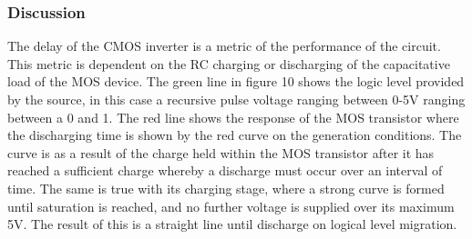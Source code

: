 \documentclass[12pt]{article}
\begin{document}
\subsubsection{Discussion}
The delay of the CMOS inverter is a metric of the performance of the circuit. This metric is dependent on the RC charging or discharging of the capacitative load of the MOS device. The green line in figure 10 shows the logic level provided by the source, in this case a recursive pulse voltage ranging between 0-5V ranging between a 0 and 1. The red line shows the response of the MOS transistor where the discharging time is shown by the red curve on the generation conditions. The curve is as a result of the charge held within the MOS transistor after it has reached a sufficient charge whereby a discharge must occur over an interval of time. The same is true with its charging stage, where a strong curve is formed until saturation is reached, and no further voltage is supplied over its maximum 5V. The result of this is a straight line until discharge on logical level migration.
\end{document}

